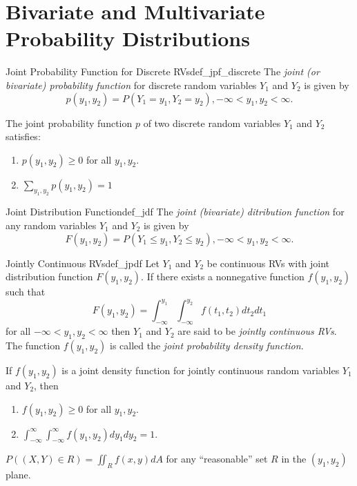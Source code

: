 \section{Bivariate and Multivariate Probability Distributions}

\begin{mydef}{Joint Probability Function for Discrete RVs}{def_jpf_discrete}
	The \emph{joint (or bivariate) probability function} for discrete random variables $Y_1$ and $Y_2$ is given by
	\[p(y_1, y_2) = P(Y_1 = y_1, Y_2 = y_2), -\infty<y_1, y_2<\infty.\]
\end{mydef}

\begin{remark}
	The joint probability function $p$ of two discrete random variables $Y_1$ and $Y_2$ satisfies:
	\begin{enumerate}
		\item $p(y_1, y_2)\geq 0$ for all $y_1, y_2$.
		\item $\displaystyle \sum_{y_1, y_2}p(y_1, y_2) = 1$ 
	\end{enumerate}
\end{remark}

\begin{mydef}{Joint Distribution Function}{def_jdf}
The \emph{joint (bivariate) ditribution function} for any random variables $Y_1$ and $Y_2$ is given by
\[F(y_1, y_2) = P(Y_1 \leq y_1, Y_2\leq y_2), -\infty<y_1, y_2 < \infty.\]
\end{mydef}

\begin{mydef}{Jointly Continuous RVs}{def_jpdf}
	Let $Y_1$ and $Y_2$ be continuous RVs with joint distribution function $F(y_1, y_2)$. If there exists a nonnegative function $f(y_1, y_2)$ such that
	\[F(y_1, y_2) = \int_{-\infty}^{y_1}\int_{-\infty}^{y_2}f(t_1, t_2) dt_{2} dt_{1}\]
	for all $-\infty < y_1, y_2 < \infty$ then $Y_1$ and $Y_2$ are said to be \emph{jointly continuous RVs}. The function $f(y_1, y_2)$ is called the \emph{joint probability density function}.
\end{mydef}

\begin{remark}
	If $f(y_1, y_2)$ is a joint density function for jointly continuous random variables $Y_1$ and $Y_2$, then
	\begin{enumerate}
		\item $f(y_1, y_2)\geq 0$ for all $y_1, y_2$.
		\item $\displaystyle \int_{-\infty}^{\infty}\int_{-\infty}^{\infty}f(y_1, y_2)dy_{1}dy_{2} = 1$.
	\end{enumerate}
\end{remark}
\begin{remark}
	$\displaystyle P((X, Y)\in R) =  \iint_{R}f(x,y)dA$ for any ``reasonable'' set $R$ in the $(y_1, y_2)$ plane. 
\end{remark}

